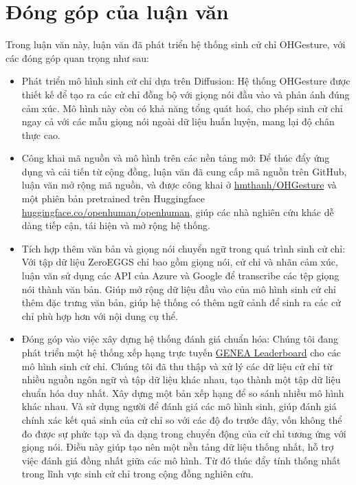 


\section{Đóng góp của luận văn}

Trong luận văn này, luận văn đã phát triển hệ thống sinh cử chỉ OHGesture, với các đóng góp quan trọng như sau:

\begin{itemize}
	\item Phát triển mô hình sinh cử chỉ dựa trên Diffusion: Hệ thống OHGesture được thiết kế để tạo ra các cử chỉ đồng bộ với giọng nói đầu vào và phản ánh đúng cảm xúc. Mô hình này còn có khả năng tổng quát hoá, cho phép sinh cử chỉ ngay cả với các mẫu giọng nói ngoài dữ liệu huấn luyện, mang lại độ chân thực cao.
	
	\item Công khai mã nguồn và mô hình trên các nền tảng mở: Để thúc đẩy ứng dụng và cải tiến từ cộng đồng, luận văn đã cung cấp mã nguồn trên GitHub, luận văn mở rộng mã nguồn, và được công khai ở \hyperlink{https://github.com/hmthanh/OHGesture}{hmthanh/OHGesture} và một phiên bản pretrained trên Huggingface \hyperlink{https://huggingface.co/openhuman/openhuman}{huggingface.co/openhuman/openhuman}, giúp các nhà nghiên cứu khác dễ dàng tiếp cận, tái hiện và mở rộng hệ thống.
	
	\item Tích hợp thêm văn bản và giọng nói chuyển ngữ trong quá trình sinh cử chỉ: Với tập dữ liệu ZeroEGGS chỉ bao gồm giọng nói, cử chỉ và nhãn cảm xúc, luận văn sử dụng các API của Azure và Google để transcribe các tệp giọng nói thành văn bản. Giúp mở rộng dữ liệu đầu vào của mô hình sinh cử chỉ thêm đặc trưng văn bản, giúp hệ thống có thêm ngữ cảnh để sinh ra các cử chỉ phù hợp hơn với nội dung cụ thể.
	
	\item Đóng góp vào việc xây dựng hệ thống đánh giá chuẩn hóa: Chúng tôi đang phát triển một hệ thống xếp hạng trực tuyến \hyperlink{https://genea-workshop.github.io/leaderboard/}{GENEA Leaderboard} \cite{nagy2024towards} cho các mô hình sinh cử chỉ. Chúng tôi đã thu thập và xử lý các dữ liệu cử chỉ từ nhiều nguồn ngôn ngữ và tập dữ liệu khác nhau, tạo thành một tập dữ liệu chuẩn hóa duy nhất. Xây dựng một bản xếp hạng để so sánh nhiều mô hình khác nhau. Và sử dụng người để đánh giá các mô hình sinh, giúp đánh giá chính xác kết quả sinh của cử chỉ so với các độ đo trước đây, vốn không thể đo được sự phức tạp và đa dạng trong chuyển động của cử chỉ tương ứng với giọng nói. Điều này giúp tạo nên một nền tảng dữ liệu thống nhất, hỗ trợ việc đánh giá đồng nhất giữa các mô hình. Từ đó thúc đẩy tính thống nhất trong lĩnh vực sinh cử chỉ trong cộng đồng nghiên cứu.
	

\end{itemize}
